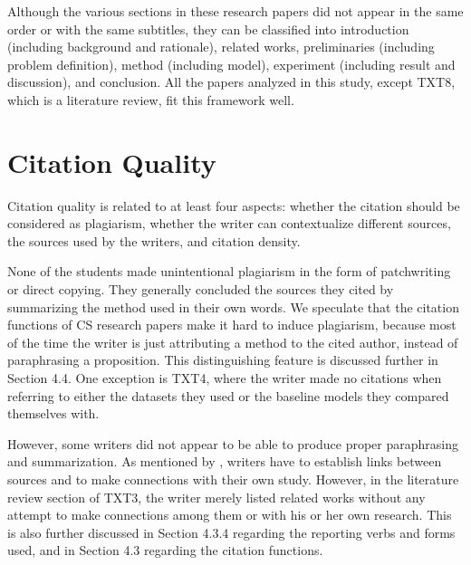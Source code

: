 Although the various sections in these research papers did not appear in the same order or with the same subtitles, they can be classified into introduction (including background and rationale), related works, preliminaries (including problem definition), method (including model), experiment (including result and discussion), and conclusion. All the papers analyzed in this study, except TXT8, which is a literature review, fit this framework well.

\section{Citation Quality}
Citation quality is related to at least four aspects: whether the citation should be considered as plagiarism, whether the writer can contextualize different sources, the sources used by the writers, and citation density.

None of the students made unintentional plagiarism in the form of patchwriting or direct copying. They generally concluded the sources they cited by summarizing the method used in their own words. We speculate that the citation functions of CS research papers make it hard to induce plagiarism, because most of the time the writer is just attributing a method to the cited author, instead of paraphrasing a proposition. This distinguishing feature is discussed further in Section 4.4. One exception is TXT4, where the writer made no citations when referring to either the datasets they used or the baseline models they compared themselves with.

However, some writers did not appear to be able to produce proper paraphrasing and summarization. As mentioned by \citep{hyland_representing_2005}, writers have to establish links between sources and to make connections with their own study. However, in the literature review section of TXT3, the writer merely listed related works without any attempt to make connections among them or with his or her own research. This is also further discussed in Section 4.3.4 regarding the reporting verbs and forms used, and in Section 4.3 regarding the citation functions.

